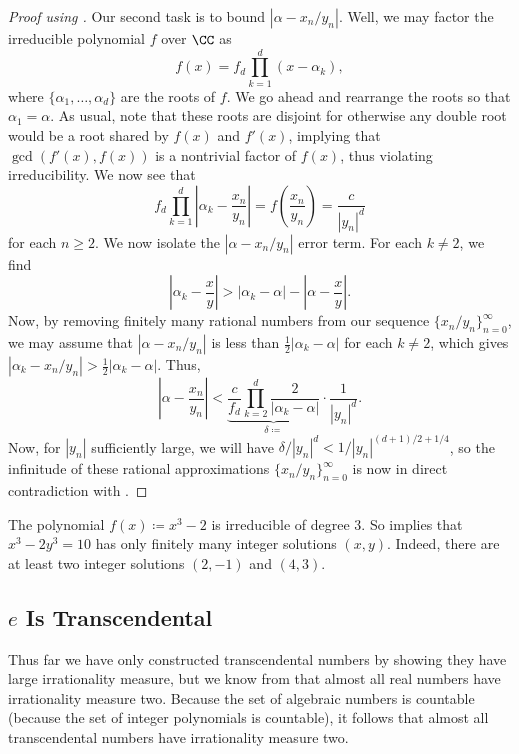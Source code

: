 \documentclass[../notes.tex]{subfiles}
\begin{document}
\begin{proof}[Proof using ]
	Our second task is to bound $\left|\alpha-x_n/y_n\right|$. Well, we may factor the irreducible polynomial $f$ over $\CC$ as
	\[f(x)=f_d\prod_{k=1}^d(x-\alpha_k),\]
	where $\{\alpha_1,\ldots,\alpha_d\}$ are the roots of $f$. We go ahead and rearrange the roots so that $\alpha_1=\alpha$. As usual, note that these roots are disjoint for otherwise any double root would be a root shared by $f(x)$ and $f'(x)$, implying that $\gcd(f'(x),f(x))$ is a nontrivial factor of $f(x)$, thus violating irreducibility. We now see that
	\[f_d\prod_{k=1}^d\left|\alpha_k-\frac{x_n}{y_n}\right|=f\left(\frac{x_n}{y_n}\right)=\frac c{\left|y_n\right|^d}\]
	for each $n\ge2$. We now isolate the $\left|\alpha-x_n/y_n\right|$ error term. For each $k\ne2$, we find
	\[\left|\alpha_k-\frac xy\right|>\left|\alpha_k-\alpha\right|-\left|\alpha-\frac xy\right|.\]
	Now, by removing finitely many rational numbers from our sequence $\{x_n/y_n\}_{n=0}^\infty$, we may assume that $\left|\alpha-x_n/y_n\right|$ is less than $\frac12\left|\alpha_k-\alpha\right|$ for each $k\ne2$, which gives $\left|\alpha_k-x_n/y_n\right|>\frac12\left|\alpha_k-\alpha\right|$. Thus,
	\[\left|\alpha-\frac{x_n}{y_n}\right|<\underbrace{\frac c{f_d}\prod_{k=2}^d\frac2{\left|\alpha_k-\alpha\right|}}_{\delta\coloneqq}\cdot\frac1{\left|y_n\right|^d}.\]
	Now, for $\left|y_n\right|$ sufficiently large, we will have $\delta/\left|y_n\right|^d<1/\left|y_n\right|^{(d+1)/2+1/4}$, so the infinitude of these rational approximations $\{x_n/y_n\}_{n=0}^\infty$ is now in direct contradiction with .
\end{proof}
\begin{example}
	The polynomial $f(x)\coloneqq x^3-2$ is irreducible of degree $3$. So  implies that $x^3-2y^3=10$ has only finitely many integer solutions $(x,y)$. Indeed, there are at least two integer solutions $(2,-1)$ and $(4,3)$.
\end{example}

\subsection{\texorpdfstring{$e$}{e} Is Transcendental}
Thus far we have only constructed transcendental numbers by showing they have large irrationality measure, but we know from  that almost all real numbers have irrationality measure two. Because the set of algebraic numbers is countable (because the set of integer polynomials is countable), it follows that almost all transcendental numbers have irrationality measure two.
\end{document}
